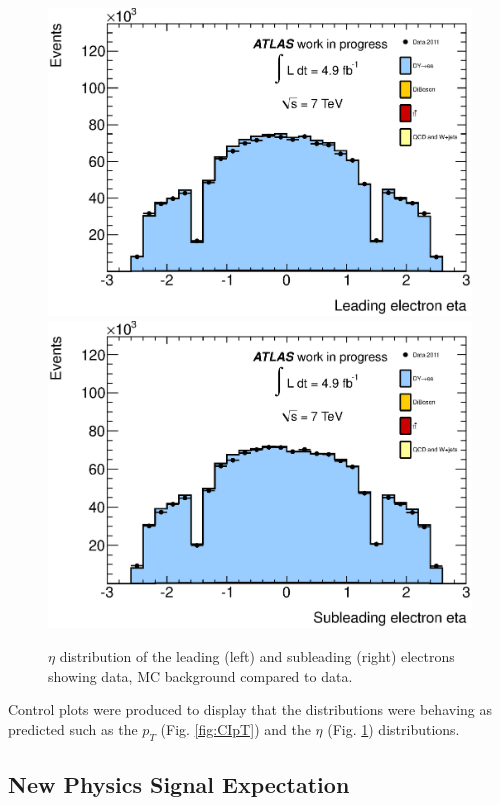 \begin{figure}[h!]
\centering
\includegraphics[width=0.49\linewidth]{images/lead_eta.eps}
\includegraphics[width=0.49\linewidth]{images/sub_eta.eps}
\caption{$\eta$ distribution of the leading (left) and subleading (right) electrons showing data, MC background compared to data.}
\label{fig:eta}
\end{figure}

Control plots were produced to display that the distributions were behaving as predicted such as the $p_{T}$ (Fig. \ref{fig:CIpT}) and the $\eta$ (Fig. \ref{fig:eta}) distributions.





\subsection{New Physics Signal Expectation}

